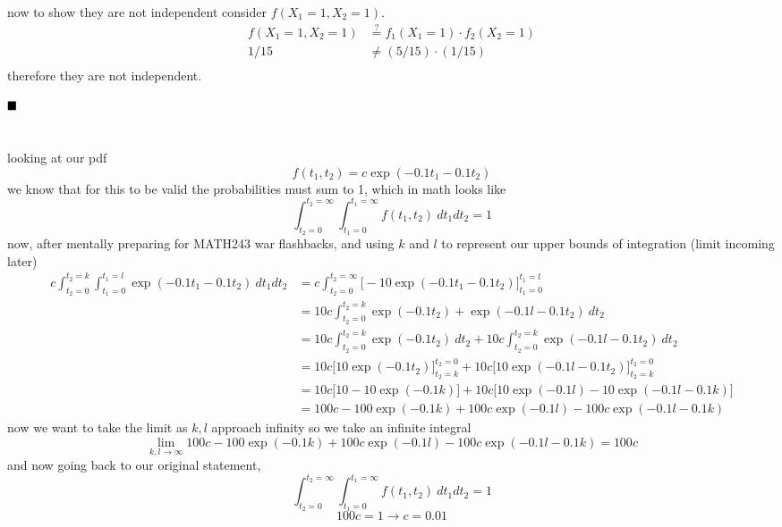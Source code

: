 \documentclass{article}
\begin{document}
now to show they are not independent consider $f(X_1=1, X_2=1)$.
\begin{align*}
    f(X_1=1, X_2=1) &\stackrel{?}{=} f_1(X_1 = 1) \cdot f_2(X_2=1) \\
    1/15 &\neq (5/15) \cdot (1/15) \\
\end{align*}
therefore they are not independent.

$\hfill \blacksquare$
\vspace{2em}
\noindent\makebox[\linewidth]{\rule{\textwidth}{0.4pt}}
\vspace{2em}

\section{}
looking at our pdf
\[ f(t_1, t_2) = c \exp (-0.1t_1 - 0.1t_2) \]
we know that for this to be valid the probabilities must sum to 1, which in math looks like
\[ \int_{t_2 = 0}^{t_2 = \infty} \int_{t_1=0}^{t_1=\infty} f(t_1, t_2) \ dt_1 dt_2 = 1 \]
now, after mentally preparing for MATH243 war flashbacks, and using $k$ and $l$ to represent our upper bounds of integration (limit incoming later)
\begin{align*}
    c \int_{t_2 = 0}^{t_2 = k} \int_{t_1=0}^{t_1=l}  \exp (-0.1t_1 - 0.1t_2) \ dt_1 dt_2 &= c \int_{t_2 = 0}^{t_2 = \infty} \biggl[ -10 \exp(-0.1t_1 - 0.1t_2) \biggr]_{t_1=0}^{t_1 = l} \\
    &= 10c \int_{t_2 = 0}^{t_2 = k}  \exp(-0.1t_2) + \exp(-0.1l - 0.1t_2) \ dt_2\\
    &= 10c \int_{t_2 = 0}^{t_2 = k}  \exp(-0.1t_2)\ dt_2 + 10 c \int_{t_2 = 0}^{t_2 = k} \exp(-0.1l - 0.1t_2) \ dt_2\\
    &= 10c \biggl[ 10 \exp(-0.1t_2) \biggr]_{t_2=k}^{t_2=0} + 10c \biggl[10 \exp(-0.1l -0.1t_2) \biggr]_{t_2 = k}^{t_2=0} \\
    &= 10c \bigl[ 10 - 10\exp(-0.1k) \bigr] + 10c \bigl[10 \exp(-0.1l) - 10 \exp(-0.1l - 0.1k)\bigr] \\
    &= 100c - 100\exp(-0.1k) + 100c\exp(-0.1l)  - 100c \exp(-0.1l - 0.1k)
\end{align*}
now we want to take the limit as $k,l$ approach infinity so we take an infinite integral 
\[ \lim_{k,l \rightarrow \infty} 100c - 100\exp(-0.1k) + 100c\exp(-0.1l)  - 100c \exp(-0.1l - 0.1k) = 100c  \]
and now going back to our original statement,
\[ \int_{t_2 = 0}^{t_2 = \infty} \int_{t_1=0}^{t_1=\infty} f(t_1, t_2) \ dt_1 dt_2 = 1 \]
\[ \boxed{100c = 1 \longrightarrow c = 0.01} \]
\end{document}
